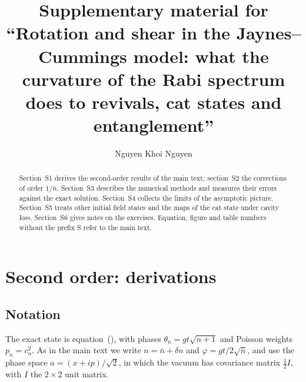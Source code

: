 \documentclass{iopjournal}
\newcommand{\nbar}{\bar{n}}
\begin{document}

\title{Supplementary material for ``Rotation and shear in the Jaynes--Cummings model: what the curvature of the Rabi spectrum does to revivals, cat states and entanglement''}

\author{Nguyen Khoi Nguyen}


\begin{abstract}
Section~S1 derives the second-order results of the main text; section~S2 the corrections of order $1/\nbar$. Section~S3 describes the numerical methods and measures their errors against the exact solution. Section~S4 collects the limits of the asymptotic picture. Section~S5 treats other initial field states and the maps of the cat state under cavity loss. Section~S6 gives notes on the exercises. Equation, figure and table numbers without the prefix S refer to the main text.
\end{abstract}

\section{Second order: derivations}

\subsection{Notation}
The exact state is equation~(), with phases $\theta_n = gt\sqrt{n+1}$ and Poisson weights $p_n = c_n^2$. As in the main text we write $n = \nbar + \delta n$ and $\varphi = gt/2\sqrt{\nbar}$, and use the phase space $a = (x+ip)/\sqrt{2}$, in which the vacuum has covariance matrix $\tfrac12 I$, with $I$ the $2\times2$ unit matrix.
\end{document}
